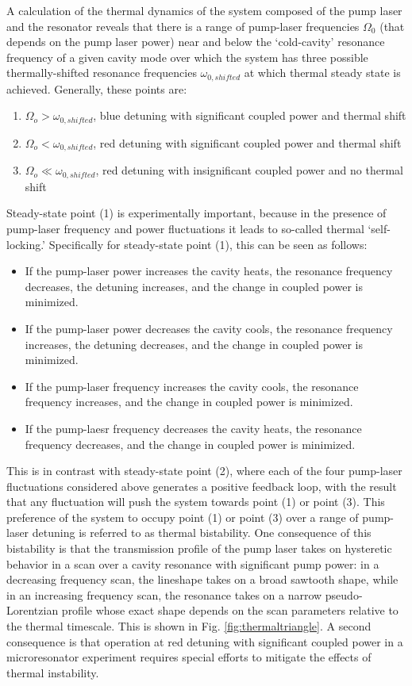 A calculation of the thermal dynamics of the system \cite{Carmon2004} composed of the pump laser and the resonator reveals that there is a range of pump-laser frequencies $\Omega_0$ (that depends on the pump laser power) near and below the `cold-cavity' resonance frequency of a given cavity mode over which the system has three possible thermally-shifted resonance frequencies $\omega_{0,shifted}$ at which thermal steady state is achieved. Generally, these points are:
\begin{enumerate}
\item $\Omega_o>\omega_{0,shifted}$, blue detuning with significant coupled power and thermal shift
\item $\Omega_o<\omega_{0,shifted}$, red detuning with significant coupled power and thermal shift
\item $\Omega_o\ll\omega_{0,shifted}$, red detuning with insignificant coupled power and no thermal shift
\end{enumerate}
Steady-state point (1) is experimentally important, because in the presence of pump-laser frequency and power fluctuations it leads to so-called thermal `self-locking.' Specifically for steady-state point (1), this can be seen as follows: 
\begin{itemize}
	\item If the pump-laser power increases the cavity heats, the resonance frequency decreases, the detuning increases, and the change in coupled power is minimized.
	\item If the pump-laser power decreases the cavity cools, the resonance frequency increases, the detuning decreases, and the change in coupled power is minimized.
	\item If the pump-laser frequency increases the cavity cools, the resonance frequency increases, and the change in coupled power is minimized.
	\item If the pump-laesr frequency decreases the cavity heats, the resonance frequency decreases, and the change in coupled power is minimized.
	\end{itemize}
This is in contrast with steady-state point (2), where each of the four pump-laser fluctuations considered above generates a positive feedback loop, with the result that any fluctuation will push the system towards point (1) or point (3). This preference of the system to occupy point (1) or point (3) over a range of pump-laser detuning is referred to as thermal bistability. One consequence of this bistability is that the transmission profile of the pump laser takes on hysteretic behavior in a scan over a cavity resonance with significant pump power: in a decreasing frequency scan, the lineshape takes on a broad sawtooth shape, while in an increasing frequency scan, the resonance takes on a narrow pseudo-Lorentzian profile whose exact shape depends on the scan parameters relative to the thermal timescale. This is shown in Fig. \ref{fig:thermaltriangle}. \color{red}A second consequence is that operation at red detuning with significant coupled power in a microresonator experiment requires special efforts to mitigate the effects of thermal instability.\color{black}








